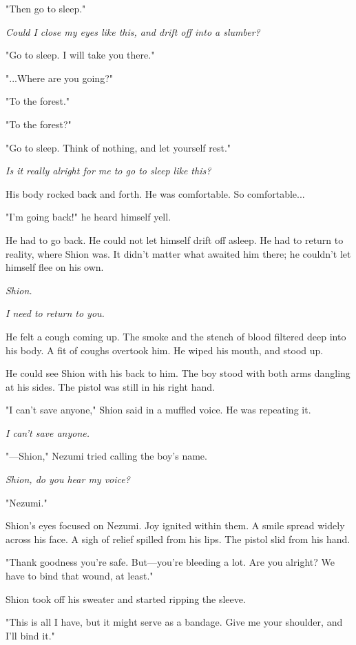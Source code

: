 "Then go to sleep."

\emph{Could I close my eyes like this, and drift off into a slumber?}

"Go to sleep. I will take you there."

"...Where are you going?"

"To the forest."

"To the forest?"

"Go to sleep. Think of nothing, and let yourself rest."

\emph{Is it really alright for me to go to sleep like this?}

His body rocked back and forth. He was comfortable. So comfortable...

"I'm going back!" he heard himself yell.

He had to go back. He could not let himself drift off asleep. He had to
return to reality, where Shion was. It didn't matter what awaited him
there; he couldn't let himself flee on his own.

\emph{Shion.}

\emph{I need to return to you.}

\myspace

He felt a cough coming up. The smoke and the stench of blood filtered
deep into his body. A fit of coughs overtook him. He wiped his mouth,
and stood up.

He could see Shion with his back to him. The boy stood with both arms
dangling at his sides. The pistol was still in his right hand.

"I can't save anyone," Shion said in a muffled voice. He was repeating
it.

\emph{I can't save anyone.}

"---Shion," Nezumi tried calling the boy's name.

\emph{Shion, do you hear my voice?}

"Nezumi."

Shion's eyes focused on Nezumi. Joy ignited within them. A smile spread
widely across his face. A sigh of relief spilled from his lips. The
pistol slid from his hand.

"Thank goodness you're safe. But---you're bleeding a lot. Are you alright?
We have to bind that wound, at least."

Shion took off his sweater and started ripping the sleeve.

"This is all I have, but it might serve as a bandage. Give me your
shoulder, and I'll bind it."

